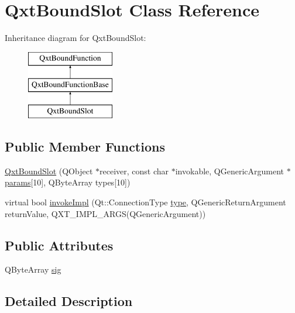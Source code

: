 \hypertarget{class_qxt_bound_slot}{\section{Qxt\-Bound\-Slot Class Reference}
\label{class_qxt_bound_slot}
}
Inheritance diagram for Qxt\-Bound\-Slot\-:\begin{figure}[H]
\begin{center}
\leavevmode
\includegraphics[height=3.000000cm]{class_qxt_bound_slot}
\end{center}
\end{figure}
\subsection*{Public Member Functions}
\begin{DoxyCompactItemize}
\item 
\hyperlink{class_qxt_bound_slot_a5489188e58ca8d3657ceb54af910aa42}{Qxt\-Bound\-Slot} (Q\-Object $\ast$receiver, const char $\ast$invokable, Q\-Generic\-Argument $\ast$\hyperlink{glext_8h_afeb6390ab3bc8a0e96a88aff34d52288}{params}\mbox{[}10\mbox{]}, Q\-Byte\-Array types\mbox{[}10\mbox{]})
\item 
virtual bool \hyperlink{class_qxt_bound_slot_af3af0cf2b5c1c11fee4b5bf7951b6d74}{invoke\-Impl} (Qt\-::\-Connection\-Type \hyperlink{glext_8h_a7d05960f4f1c1b11f3177dc963a45d86}{type}, Q\-Generic\-Return\-Argument return\-Value, Q\-X\-T\-\_\-\-I\-M\-P\-L\-\_\-A\-R\-G\-S(Q\-Generic\-Argument))
\end{DoxyCompactItemize}
\subsection*{Public Attributes}
\begin{DoxyCompactItemize}
\item 
Q\-Byte\-Array \hyperlink{class_qxt_bound_slot_a9a63bb5358f695ba950a35ce67464016}{sig}
\end{DoxyCompactItemize}


\subsection{Detailed Description}


